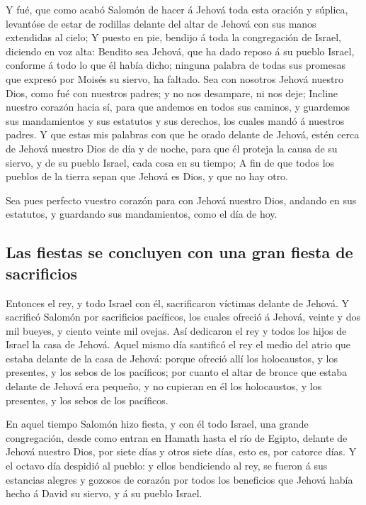  Y fué, que como acabó Salomón de hacer á Jehová toda esta
oración y súplica, levantóse de estar de rodillas delante del altar de
Jehová con sus manos extendidas al cielo;  Y puesto en pie,
bendijo á toda la congregación de Israel, diciendo en voz alta:
 Bendito sea Jehová, que ha dado reposo á su pueblo Israel,
conforme á todo lo que él había dicho; ninguna palabra de todas sus
promesas que expresó por Moisés su siervo, ha faltado.  Sea
con nosotros Jehová nuestro Dios, como fué con nuestros padres; y no nos
desampare, ni nos deje;  Incline nuestro corazón hacia sí,
para que andemos en todos sus caminos, y guardemos sus mandamientos y
sus estatutos y sus derechos, los cuales mandó á nuestros padres.
 Y que estas mis palabras con que he orado delante de
Jehová, estén cerca de Jehová nuestro Dios de día y de noche, para que
él proteja la causa de su siervo, y de su pueblo Israel, cada cosa en su
tiempo;  A fin de que todos los pueblos de la tierra sepan
que Jehová es Dios, y que no hay otro.

 Sea pues perfecto vuestro corazón para con Jehová nuestro
Dios, andando en sus estatutos, y guardando sus mandamientos, como el
día de hoy.

\hypertarget{las-fiestas-se-concluyen-con-una-gran-fiesta-de-sacrificios}{%
\subsection{Las fiestas se concluyen con una gran fiesta de
sacrificios}\label{las-fiestas-se-concluyen-con-una-gran-fiesta-de-sacrificios}}

 Entonces el rey, y todo Israel con él, sacrificaron
víctimas delante de Jehová.  Y sacrificó Salomón por
sacrificios pacíficos, los cuales ofreció á Jehová, veinte y dos mil
bueyes, y ciento veinte mil ovejas. Así dedicaron el rey y todos los
hijos de Israel la casa de Jehová.  Aquel mismo día
santificó el rey el medio del atrio que estaba delante de la casa de
Jehová: porque ofreció allí los holocaustos, y los presentes, y los
sebos de los pacíficos; por cuanto el altar de bronce que estaba delante
de Jehová era pequeño, y no cupieran en él los holocaustos, y los
presentes, y los sebos de los pacíficos.

 En aquel tiempo Salomón hizo fiesta, y con él todo Israel,
una grande congregación, desde como entran en Hamath hasta el río de
Egipto, delante de Jehová nuestro Dios, por siete días y otros siete
días, esto es, por catorce días.  Y el octavo día despidió
al pueblo: y ellos bendiciendo al rey, se fueron á sus estancias alegres
y gozosos de corazón por todos los beneficios que Jehová había hecho á
David su siervo, y á su pueblo Israel.

